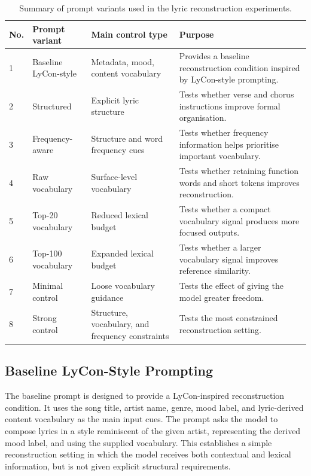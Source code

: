 \begin{table}[ht]
\centering
\renewcommand{\arraystretch}{1.45}
\caption{Summary of prompt variants used in the lyric reconstruction experiments.}
\label{tab:prompt_variants}
\begin{tabular}{
p{}
>{\raggedright\arraybackslash}p{}
>{\raggedright\arraybackslash}p{}
>{\raggedright\arraybackslash}p{}
}
\hline
No. & Prompt variant & Main control type & Purpose \\
\hline
1 & Baseline LyCon-style & Metadata, mood, content vocabulary & Provides a baseline reconstruction condition inspired by LyCon-style prompting. \\
2 & Structured & Explicit lyric structure & Tests whether verse and chorus instructions improve formal organisation. \\
3 & Frequency-aware & Structure and word frequency cues & Tests whether frequency information helps prioritise important vocabulary. \\
4 & Raw vocabulary & Surface-level vocabulary & Tests whether retaining function words and short tokens improves reconstruction. \\
5 & Top-20 vocabulary & Reduced lexical budget & Tests whether a compact vocabulary signal produces more focused outputs. \\
6 & Top-100 vocabulary & Expanded lexical budget & Tests whether a larger vocabulary signal improves reference similarity. \\
7 & Minimal control & Loose vocabulary guidance & Tests the effect of giving the model greater freedom. \\
8 & Strong control & Structure, vocabulary, and frequency constraints & Tests the most constrained reconstruction setting. \\
\hline
\end{tabular}
\renewcommand{\arraystretch}{1.0}
\end{table}




\subsection{Baseline LyCon-Style Prompting}

The baseline prompt is designed to provide a LyCon-inspired reconstruction condition. It uses the song title, artist name, genre, mood label, and lyric-derived content vocabulary as the main input cues. The prompt asks the model to compose lyrics in a style reminiscent of the given artist, representing the derived mood label, and using the supplied vocabulary. This establishes a simple reconstruction setting in which the model receives both contextual and lexical information, but is not given explicit structural requirements.

